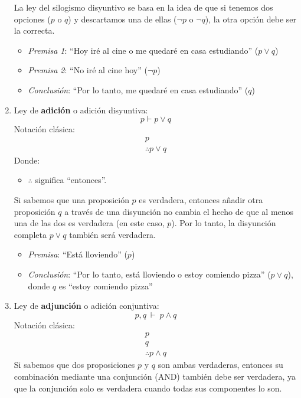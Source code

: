 \begin{enumerate}[label=\alph*)]
	La ley del silogismo disyuntivo se basa en la idea de que si tenemos dos opciones ($p$ o $q$) y descartamos una de ellas ($\neg p$ o $\neg q$), la otra opción debe ser la correcta.
	
	\begin{fmd-example} 
		\begin{itemize}
			\item \textit{Premisa 1}: ``Hoy iré al cine o me quedaré en casa estudiando'' ($p \lor q$)
			\item \textit{Premisa 2}: ``No iré al cine hoy'' ($\neg p$)
			\item \textit{Conclusión}: ``Por lo tanto, me quedaré en casa estudiando'' ($q$)
		\end{itemize}
	\end{fmd-example}
	
	\item Ley de \textbf{adición} o adición disyuntiva: 
	\[ p \vdash p \lor q \]
	Notación clásica:
	\[
	\begin{array}{l}
		p\\ \hline
		\therefore p \lor q
	\end{array}
	\]
	Donde:
	\begin{itemize}
		\item $\therefore$ significa ``entonces''.
	\end{itemize}
	
	Si sabemos que una proposición $p$ es verdadera, entonces añadir otra proposición $q$ a través de una disyunción no cambia el hecho de que al menos una de las dos es verdadera (en este caso, $p$). Por lo tanto, la disyunción completa $p \lor q$ también será verdadera.
	
	\begin{fmd-example}[Adición]
		\begin{itemize}
			\item \textit{Premisa}: ``Está lloviendo'' ($p$)
			\item \textit{Conclusión}: ``Por lo tanto, está lloviendo o estoy comiendo pizza'' ($p \lor q$), donde $q$ es ``estoy comiendo pizza''
		\end{itemize}
	\end{fmd-example}
	
	\item Ley de \textbf{adjunción} o adición conjuntiva:  
	\[ p, q \ \vdash \ p \land q \]
	Notación clásica:
	\[
	\begin{array}{l}
		p\\
		q\\ \hline
		\therefore p \land q
	\end{array}
	\]
	Si sabemos que dos proposiciones $p$ y $q$ son ambas verdaderas, entonces su combinación mediante una conjunción (AND) también debe ser verdadera, ya que la conjunción solo es verdadera cuando todas sus componentes lo son.
	

\end{enumerate}

